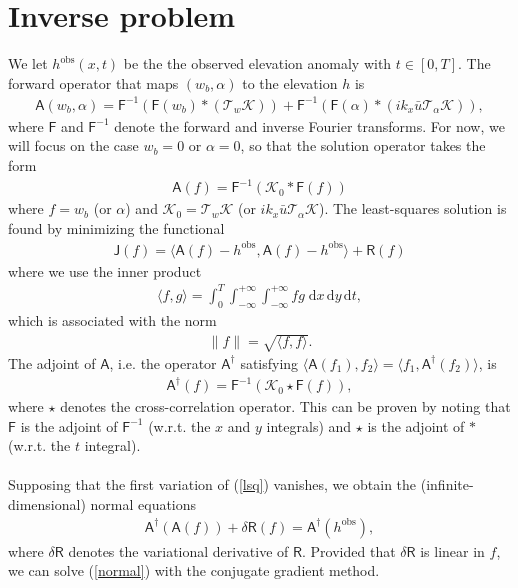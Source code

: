 \documentclass[paper=a4, fontsize=11pt]{article}
\begin{document}
\section*{Inverse problem}
We let ${h}^{\mathrm{obs}}(x,t)$ be the the observed elevation anomaly with $t\in[0,T]$.
The forward operator that maps $(w_b,\alpha)$ to the elevation $h$ is
\begin{align}
\mathsf{A}(w_b,\alpha) = \mathsf{F}^{-1} \left( \mathsf{F}({w}_b)*(\mathcal{T}_w \mathcal{K})\right) + \mathsf{F}^{-1}\left( \mathsf{F}(\alpha) * (ik_x\bar{u}\mathcal{T}_{\alpha}\mathcal{K})\right),
\end{align}
where $\mathsf{F}$ and $\mathsf{F}^{-1}$ denote the forward and inverse Fourier transforms.
For now, we will focus on the case $w_b=0$ or $\alpha=0$, so that the
solution operator takes the form
\begin{align}
\mathsf{A}(f) = \mathsf{F}^{-1} \left( \mathcal{K}_0* \mathsf{F}(f)\right)
\end{align}
where $f=w_b$ (or $\alpha$) and $\mathcal{K}_0 =\mathcal{T}_w \mathcal{K} $ (or $ik_x\bar{u}\mathcal{T}_{\alpha}\mathcal{K}$).
The least-squares solution is found by minimizing the functional
\begin{align}
\mathsf{J}(f) = \langle \mathsf{A}(f) - h^{\mathrm{obs}} ,\mathsf{A}(f) - h^{\mathrm{obs}} \rangle + \mathsf{R}(f) \label{lsq}
\end{align}
where we use the inner product
\begin{align}
\langle f,g\rangle = \int_0^T \int_{-\infty}^{+\infty} \int_{-\infty}^{+\infty} fg \;\mathrm{d}x\,\mathrm{d}y\,\mathrm{d}t,
\end{align}
which is associated with the norm
\begin{align}
\| f \| = \sqrt{\langle f,f\rangle}.
\end{align}
The adjoint of $\mathsf{A}$, i.e. the
operator $\mathsf{A}^\dagger$  satisfying $\langle \mathsf{A}(f_1),f_2 \rangle = \langle f_1, \mathsf{A}^\dagger(f_2) \rangle$,
is
\begin{align}
\mathsf{A}^\dagger (f) = \mathsf{F}^{-1} \left( \mathcal{K}_0 \star \mathsf{F}(f)\right),
\end{align}
where $\star$ denotes the cross-correlation operator.
This can be proven by noting that $\mathsf{F}$ is the adjoint of $\mathsf{F}^{-1}$ (w.r.t. the $x$ and $y$ integrals)
and $\star$ is the adjoint of $*$ (w.r.t. the $t$ integral).\\ \\
Supposing that the first variation of (\ref{lsq}) vanishes, we obtain the
(infinite-dimensional) normal equations
\begin{align}
\mathsf{A}^\dagger (\mathsf{A}(f)) + \delta\mathsf{R}(f) = \mathsf{A}^\dagger (h^{\mathrm{obs}}), \label{normal}
\end{align}
where $\delta\mathsf{R}$ denotes the variational derivative of $\mathsf{R}$.
Provided that $\delta\mathsf{R}$ is linear in $f$, we can solve (\ref{normal})
with the conjugate gradient method.
\end{document}
